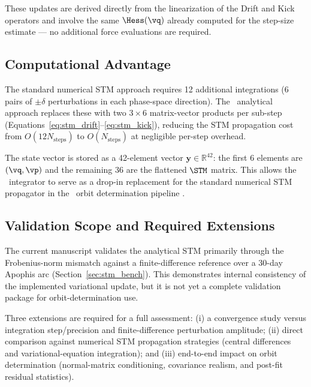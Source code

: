 These updates are derived directly from the linearization of the
Drift and Kick operators and involve the same $\Hess(\vq)$ already
computed for the step-size estimate — no additional force evaluations
are required.

\subsection{Computational Advantage}
\label{sec:stm_cost}

The standard numerical STM approach requires 12 additional
integrations (6 pairs of $\pm\delta$ perturbations in each
phase-space direction). The \AAS\ analytical approach replaces
these with two $3\times6$ matrix-vector products per sub-step
(Equations~\ref{eq:stm_drift}--\ref{eq:stm_kick}), reducing the
STM propagation cost from $O(12N_{\mathrm{steps}})$ to
$O(N_{\mathrm{steps}})$ at negligible per-step overhead.

The state vector is stored as a 42-element vector
$\mathbf{y} \in \mathbb{R}^{42}$: the first 6 elements are
$(\vq, \vp)$ and the remaining 36 are the flattened $\STM$ matrix.
This allows the \AAS\ integrator to serve as a drop-in replacement
for the standard numerical STM propagator in the \astdyn\
orbit determination pipeline \citep{bigi_astdyn_library_2025}.

\subsection{Validation Scope and Required Extensions}
\label{sec:stm_validation_scope}

The current manuscript validates the analytical STM primarily through
the Frobenius-norm mismatch against a finite-difference reference over
a 30-day Apophis arc (Section~\ref{sec:stm_bench}). This demonstrates
internal consistency of the implemented variational update, but it is
not yet a complete validation package for orbit-determination use.

Three extensions are required for a full assessment:
(i) a convergence study versus integration step/precision and
finite-difference perturbation amplitude;
(ii) direct comparison against numerical STM propagation strategies
(central differences and variational-equation integration);
and (iii) end-to-end impact on orbit determination (normal-matrix
conditioning, covariance realism, and post-fit residual statistics).
